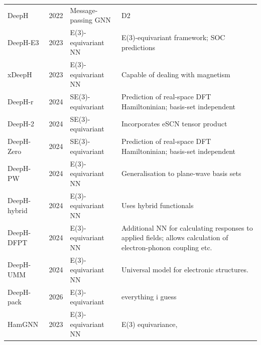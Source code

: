 \documentclass[11pt,a4paper,twoside]{report}  %
\numberwithin{equation}{section}					%
\numberwithin{figure}{section}						%
\begin{document}
\begin{table}
\begin{tabular}{lllp{8cm}}
          DeepH\autocite{liDeeplearningDensityFunctional2022} & 2022 & Message-passing GNN & D2    \\      %
          DeepH-E3\autocite{gongGeneralFrameworkE3equivariant2023, gongDataset1GeneralFramework2023} & 2023 & E(3)-equivariant NN & E(3)-equivariant framework; SOC predictions   \\   
          xDeepH \autocite{gongGeneralFrameworkE3equivariant2023, gongDataset1GeneralFramework2023} & 2023 & E(3)-equivariant NN & Capable of dealing with magnetism  \\   
       DeepH-r\autocite{yuanDeepLearningDensity2024} & 2024 &  SE(3)-equivariant & Prediction of real-space DFT Hamiltoninian; basis-set independent      \\  
        DeepH-2\autocite{yuanDeepLearningDensity2024} & 2024 &  SE(3)-equivariant & Incorporates eSCN tensor product     \\  
          DeepH-Zero\autocite{yuanDeepLearningDensity2024} & 2024 &  SE(3)-equivariant & Prediction of real-space DFT Hamiltoninian; basis-set independent      \\  
    DeepH-PW\autocite{gongGeneralizingDeepLearning2024} & 2024 & E(3)-equivariant NN & Generalisation to plane-wave basis sets \\
    DeepH-hybrid & 2024 & E(3)-equivariant NN & Uses hybrid functionals \\
          DeepH-DFPT\autocite{liDeepLearningDensityFunctional2024a} & 2024 & E(3)-equivariant NN & Additional NN for calculating responses to applied fields; allows calculation of electron-phonon coupling etc.      \\ 
      DeepH-UMM\autocite{liDeepLearningDensityFunctional2024a} & 2024 & E(3)-equivariant NN & Universal model for electronic structures.     \\ 

      DeepH-pack\autocite{liDeepHpackGeneralpurposeNeural2026} & 2026 & E(3)-equivariant & everything i guess \\
          
            \midrule                %
       HamGNN\autocite{zhongPretrainedModelsHamGNN2023} & 2023 & E(3)-equivariant NN & E(3) equivariance,  \\   


\end{tabular}
\end{table}
\end{document}
